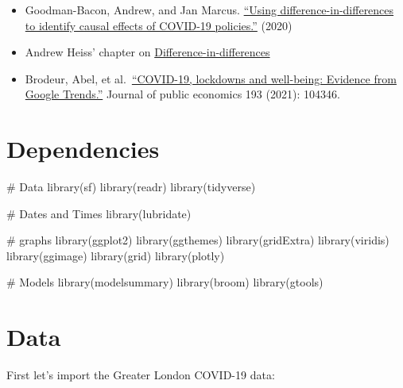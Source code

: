 \documentclass[
  letterpaper,
  DIV=11,
  numbers=noendperiod]{scrreprt}
\newenvironment{Shaded}{\begin{snugshade}}{\end{snugshade}}
\newcommand{\CommentTok}[1]{\textcolor[rgb]{0.37,0.37,0.37}{#1}}
\newcommand{\FunctionTok}[1]{\textcolor[rgb]{0.28,0.35,0.67}{#1}}
\newcommand{\NormalTok}[1]{\textcolor[rgb]{0.00,0.23,0.31}{#1}}
\begin{document}
\begin{itemize}
\item
  Goodman-Bacon, Andrew, and Jan Marcus.
  \href{https://d-nb.info/1212037294/34}{``Using
  difference-in-differences to identify causal effects of COVID-19
  policies.''} (2020)
\item
  Andrew Heiss' chapter on
  \href{https://evalf20.classes.andrewheiss.com/example/diff-in-diff/}{Difference-in-differences}
\item
  Brodeur, Abel, et
  al.~\href{https://www.sciencedirect.com/science/article/pii/S0047272720302103?casa_token=fuC4W9x8SJwAAAAA:QgZY6w7qPwTRAR0xdLlkSDKNpbivMdzwKIyIA3l3FfqOZRXwok2hqliaBwDOttESv-AtrUXjgrE}{``COVID-19,
  lockdowns and well-being: Evidence from Google Trends.''} Journal of
  public economics 193 (2021): 104346.
\end{itemize}

\hypertarget{dependencies-4}{%
\section{Dependencies}\label{dependencies-4}}

\begin{Shaded}
\begin{Highlighting}[]
\CommentTok{\# Data}
\FunctionTok{library}\NormalTok{(sf)}
\FunctionTok{library}\NormalTok{(readr)}
\FunctionTok{library}\NormalTok{(tidyverse)}

\CommentTok{\# Dates and Times}
\FunctionTok{library}\NormalTok{(lubridate)}

\CommentTok{\# graphs}
\FunctionTok{library}\NormalTok{(ggplot2)}
\FunctionTok{library}\NormalTok{(ggthemes)}
\FunctionTok{library}\NormalTok{(gridExtra)}
\FunctionTok{library}\NormalTok{(viridis)}
\FunctionTok{library}\NormalTok{(ggimage)}
\FunctionTok{library}\NormalTok{(grid)}
\FunctionTok{library}\NormalTok{(plotly)}

\CommentTok{\# Models}
\FunctionTok{library}\NormalTok{(modelsummary)}
\FunctionTok{library}\NormalTok{(broom)}
\FunctionTok{library}\NormalTok{(gtools)}
\end{Highlighting}
\end{Shaded}

\hypertarget{data-4}{%
\section{Data}\label{data-4}}

First let's import the Greater London COVID-19 data:
\end{document}
